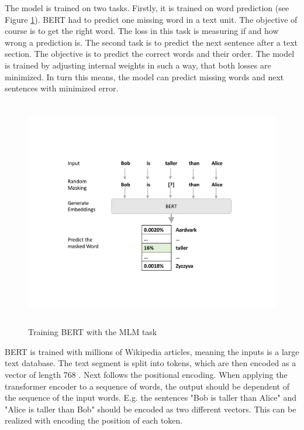            
           The model is trained on two tasks. Firstly, it is trained on word prediction (see Figure \ref{fig:mlm}). \ac{BERT} had to predict one missing word in a text unit. The objective of course is to get the right word. The loss in this task is measuring if and how wrong a prediction is. The second task is to predict the next sentence after a text section. The objective is to predict the correct words and their order. The model is trained by adjusting internal weights in such a way, that both losses are minimized. In turn this means, the model can predict missing words and next sentences with minimized error.
           
          
             \begin{figure}[h!]
             	
             	\centering
             	\includegraphics[height=10cm]{ Bilder/preprocessing/BERT/BERT-language-modeling-masked-lm.pdf}
             	\caption[Training BERT with the MLM task]{Training BERT with the MLM task \cite{alammarIllustratedBERTELMo}}
         		\label{fig:mlm}    
         \end{figure}
            
         
               BERT is trained with millions of Wikipedia articles, meaning the inputs is a large text database. The text segment is split into tokens, which are then encoded as a vector of length 768 \cite[p.~3]{BERT}. Next follows the positional encoding. When applying the transformer encoder to a sequence of words, the output should be dependent of the sequence of the input words. E.g. the sentences "Bob is taller than Alice" and "Alice is taller than Bob" should be encoded as two different vectors. This can be realized with encoding the position of each token. 
               


